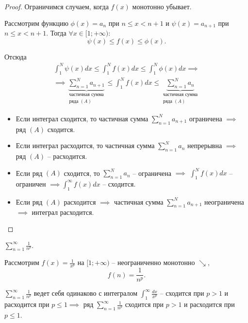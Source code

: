 \begin{proof}
    Ограничимся случаем, когда $f(x)$ монотонно убывает.

    Рассмотрим функцию $\phi(x) = a_n$ при $n \leqslant x < n+1$ и $\psi(x) = a_{n+1}$ при $n\leqslant x <n + 1$. Тогда $\forall x \in [1;+\infty)$:
    \[
        \psi(x) \leqslant f(x) \leqslant\phi(x).
    \]

    Отсюда
    \begin{multline*}
        \int_{1}^{N}\psi(x)dx \leqslant \int_{1}^{N}f(x)dx \leqslant\int_{1}^{N}\phi(x)dx \implies \\
        \implies \underbrace{\sum_{n=1}^{N}a_{n+1}}_{\begin{array}{c}
            \text{частичная сумма} \\
            \text{ряда }(A)
        \end{array}} \leqslant \int_{1}^{N}f(x)dx \leqslant \underbrace{\sum_{n=1}^{N}a_n}_{\begin{array}{c}
                \text{частичная сумма} \\
                \text{ряда }(A)
            \end{array}}
    \end{multline*}
    \begin{itemize}
        \item Если интеграл сходится, то частичная сумма $\sum_{n=1}^{N}a_{n+1}$ ограничена $\implies$ ряд $(A)$ сходится.

        \item Если интеграл расходится, то частичная сумма $\sum_{n=1}^{N}a_n$ непрерывна $\implies$ ряд $(A)$ -- расходится.

        \item Если ряд $(A)$ сходится, то $\sum_{n=1}^{N}a_n$ -- ограничена $\implies$ $\int_{1}^{N}f(x)dx$ -- ограничен $\implies \int_{1}^{\infty}f(x)dx$ -- сходится.

        \item Если ряд $(A)$ расходится $\implies$ частичная сумма $\sum_{n=1}^{N}a_{n+1}$ неограничена $\implies$ интеграл расходится.
    \end{itemize}
\end{proof}

\begin{example}
    $\sum_{n=1}^{\infty}\frac{1}{n^p}$.

    Рассмотрим $f(x) = \frac{1}{x^p}$ на $[1;+\infty)$ -- неограниченно монотонно $\searrow$,
    \[
        f(n) = \frac{1}{n^p}.
    \]

    $\sum_{n=1}^{\infty}\frac{1}{n^p}$ ведет себя одинаково с интегралом $\int_{1}^{\infty}\frac{dx}{x^p}$ -- сходится при $p>1$ и расходится при $p\leqslant1 \implies$ ряд $\sum_{n=1}^{\infty}\frac{1}{n^p}$ сходится при $p>1$ и расходится при $p\leqslant1$.
\end{example}

